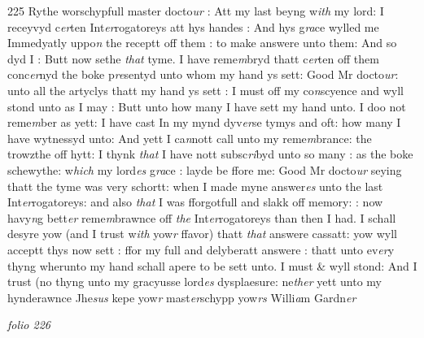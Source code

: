 \documentclass[12pt, a4paper]{book}
\begin{document}
{\color{Mahogany}225} Rythe worschypfull master docto\textit{ur} : Att my last beyng  w\textit{ith} my lord: I receyvyd c\textit{er}ten Int\textit{er}rogatoreys att hys  handes : And hys g\textit{ra}ce wylled me Immedyatly uppo\textit{n} the receptt off them : to make answere unto them: And  so dyd I : Butt now sethe\textit{ that} tyme. I have reme\textit{m}bryd thatt c\textit{er}ten off them conc\textit{er}nyd the boke p\textit{re}sentyd unto whom my hand ys sett: Good Mr docto\textit{ur}: unto all the  artyclys thatt my hand ys sett : I must off my co\textit{n}scyence and wyll stond unto as I may
			: Butt unto how many I have  sett my hand unto. I doo not reme\textit{m}ber as yett: I  have cast In my mynd dyv\textit{er}se tymys and oft: how many  I have wytnessyd unto: And yett I ca\textit{n}nott call unto my  reme\textit{m}brance: the trowzthe off hytt: I thynk \textit{that} I have nott subsc\textit{ri}byd unto so many : as the boke schewythe: w\textit{hich} my lord\textit{es} g\textit{ra}ce : layde be ffore me: Good Mr docto\textit{ur} seying thatt the tyme was very schortt: when I made myne answer\textit{es} unto the last Int\textit{er}rogatoreys: and also \textit{that} I was fforgotfull and slakk off memory: : now havy\textit{n}g bett\textit{er} reme\textit{m}brawnce off \textit{the} Int\textit{er}rogatoreys than then I had. I schall desyre yow (and I trust w\textit{ith} yow\textit{r} ffavor) thatt \textit{that} answere cassatt: yow wyll acceptt thys now sett : ffor my full and delyberatt answere : thatt unto ev\textit{er}y thyng wherunto my hand schall apere to be sett unto. I must \& wyll stond: And I trust (no thyng unto  my gracyusse lord\textit{es} dysplaesure: ne\textit{ther} yett unto my hynderawnce Jhe\textit{sus} kepe yow\textit{r} mast\textit{er}schypp  yow\textit{rs} Willi\textit{a}m Gardn\textit{er}
               
\dotfill
					

\textit{folio 226}


         \vspace{4cm}
         
\dotfill
					  \section*{}  \subsection*{}
\end{document}
